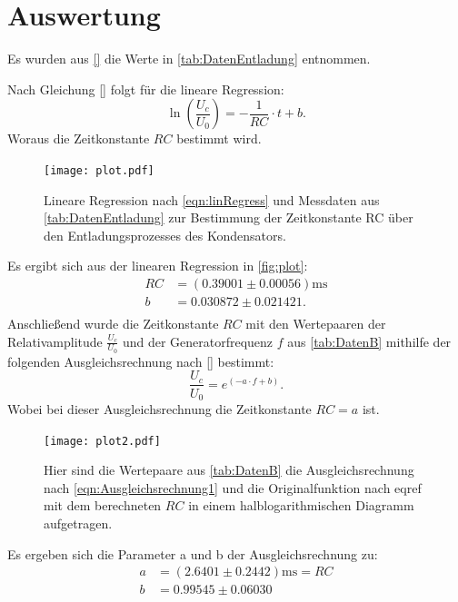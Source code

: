 \section{Auswertung}
\label{sec:Auswertung}
Es wurden aus \autoref{} die Werte in \autoref{tab:DatenEntladung} entnommen. 

Nach Gleichung \eqref{} folgt für die lineare Regression:
\begin{equation}
  \label{eqn:linRegress}
    \ln\left(\frac{U_c}{U_0}\right)=-\frac{1}{RC}\cdot t + b.
\end{equation}
Woraus die Zeitkonstante $RC$ bestimmt wird.

\begin{figure}
  \centering
  \texttt{[image: plot.pdf]}
  \caption{Lineare Regression nach \eqref{eqn:linRegress} und Messdaten aus \autoref{tab:DatenEntladung} zur Bestimmung der Zeitkonstante RC über den Entladungsprozesses des Kondensators.}
  \label{fig:plot}
\end{figure}

Es ergibt sich aus der linearen Regression in \autoref{fig:plot}:
\begin{align*}
  RC &= (0.39001\pm 0.00056)\unit{\milli\second}\\
  b &= 0.030872\pm 0.021421.\\
\end{align*}
Anschließend wurde die Zeitkonstante $RC$ mit den Wertepaaren der Relativamplitude $\frac{U_c}{U_0}$ und der Generatorfrequenz $f$
aus \autoref{tab:DatenB} mithilfe der folgenden Ausgleichsrechnung nach \eqref{} bestimmt:
\begin{equation}
  \label{eqn:Ausgleichsrechnung1}
  \frac{U_c}{U_0} = e^{(-a\cdot f + b)}.
\end{equation}
Wobei bei dieser Ausgleichsrechnung die Zeitkonstante $RC = a$ ist.
\begin{figure}
  \centering
  \texttt{[image: plot2.pdf]}
  \caption{Hier sind die Wertepaare aus \autoref{tab:DatenB} die Ausgleichsrechnung nach \eqref{eqn:Ausgleichsrechnung1} und die Originalfunktion nach eqref{} mit dem berechneten $RC$ in einem halblogarithmischen Diagramm aufgetragen.}
  \label{fig:plot2}
\end{figure}

Es ergeben sich die Parameter a und b der Ausgleichsrechnung zu:
\begin{align*}
  a &= (2.6401\pm 0.2442) \unit{\milli\second} = RC\\
  b &= 0.99545\pm 0.06030\\
\end{align*}

